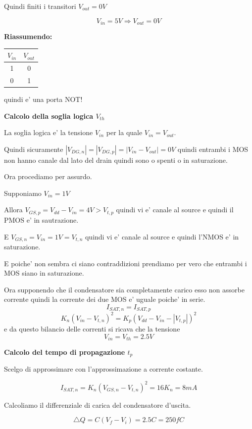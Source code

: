 \documentclass[\main/main.tex]{subfiles}
\begin{document}
Quindi finiti i transitori $V_{out} = 0V$

\[V_{in} = 5V \Rightarrow V_{out} = 0V\]

\textbf{Riassumendo:}
\begin{center}
	\begin{tabular}{ c | c }
		$V_{in}$ & $V_{out}$ \\
		\hline
		1        & 0         \\
		0        & 1         \\
	\end{tabular}
\end{center}
quindi e' una porta NOT!


\clearpage
\textbf{Calcolo della soglia logica $V_{th}$}

La soglia logica e' la tensione $V_{in}$ per la quale $V_{in} = V_{out}$.

Quindi sicuramente $|V_{DG,n}| = |V_{DG,p}| = |V_{in} - V_{out}| = 0V$ quindi entrambi i MOS non hanno canale dal lato del drain quindi sono o spenti o in saturazione.

Ora procediamo per assurdo.

Supponiamo $V_{in} = 1V$

Allora $V_{GS,p} = V_{dd} - V_{in} = 4V > V_{t,p}$ quindi vi e' canale al source e quindi il PMOS e' in sautrazione.

E $V_{GS,n} = V_{in} = 1V = V_{t,n}$ quindi vi e' canale al source e quindi l'NMOS e' in saturazione.

E poiche' non sembra ci siano contraddizioni prendiamo per vero che entrambi i MOS siano in saturazione.

Ora supponendo che il condensatore sia completamente carico esso non assorbe corrente quindi la corrente dei due MOS e' uguale poiche' in serie.
\[I_{SAT,n} = I_{SAT,p}\]
\[K_n \left(V_{in} - V_{t,n} \right )^2 = K_p \left(V_{dd} - V_{in} - |V_{t,p}| \right )^2\]
e da questo bilancio delle correnti si ricava che la tensione
\[V_{in} = V_{th} = 2.5V\]

\textbf{Calcolo del tempo di propagazione $t_p$}

Scelgo di approssimare con l'approssimazione a corrente costante.

\[I_{SAT,n} = K_n \left( V_{GS,n} - V_{t,n} \right)^2 = 16 K_n = 8mA\]

Calcoliamo il differenziale di carica del condensatore d'uscita.

\[ \triangle Q = C \left( V_f  - V_i\right) = 2.5 C = 250 fC\]
\end{document}
